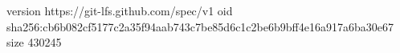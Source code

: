 version https://git-lfs.github.com/spec/v1
oid sha256:cb6b082cf5177c2a35f94aab743c7be85d6c1c2be6b9bff4e16a917a6ba30e67
size 430245
